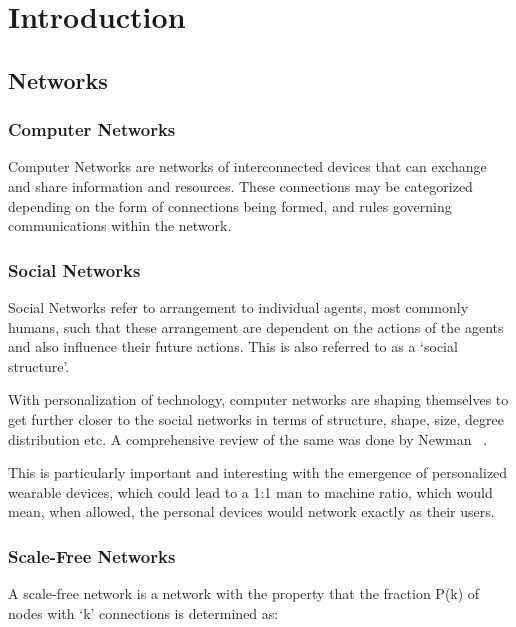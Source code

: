 
\chapter{Introduction} %

\label{Chapter1} %



\section{Networks}

\subsection{Computer Networks}
Computer Networks are networks of interconnected devices that can exchange and share information and resources. These connections may be categorized depending on the form of connections being formed, and rules governing communications within the network.

\subsection{Social Networks}
Social Networks refer to arrangement to individual agents, most commonly humans, such that these arrangement are dependent on the actions of the agents and also influence their future actions. This is also referred to as a `social structure'. 

With personalization of technology, computer networks are shaping themselves to get further closer to the social networks in terms of structure, shape, size, degree distribution etc. A comprehensive review of the same was done by Newman~\cite{Newman03thestructure} . 

This is particularly important and interesting with the emergence of personalized wearable devices, which could lead to a 1:1 man to machine ratio, which would mean, when allowed, the personal devices would network exactly as their users.

\subsection{Scale-Free Networks}
A scale-free network is a network with the property that the fraction P(k) of nodes with `k' connections  is determined as: 

